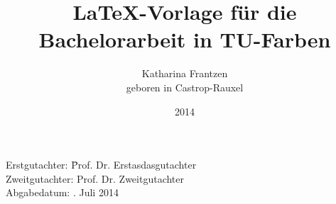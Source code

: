








\newcommand{\thetitle}{\LaTeX-Vorlage für die Bachelorarbeit in TU-Farben}
\newcommand{\Jahr}{2014}
\newcommand{\Geburtsort}{Castrop-Rauxel}
\newcommand{\Lehrstuhl}{Experimentelle Physik V}
\newcommand{\Betreuer}{Prof. Dr. Erstasdasgutachter}
\newcommand{\Zweitgutachter}{Prof. Dr. Zweitgutachter}
\newcommand{\Abgabedatum}{11. Juli 2014}

\author{
    Katharina Frantzen\\
    geboren in \Geburtsort
}

\titlehead{
    \texttt{[image: logos/tu-logo.pdf]}
}
\title{\thetitle}
\date{\Jahr}

\subject{Arbeit zur Erlangung des akademischen Grades\\Bachelor of Science}
\publishers{Lehrstuhl für \Lehrstuhl \\ Fakultät Physik \\ Technische Universität Dortmund}




\frontmatter
\maketitle
\thispagestyle{empty}
\vspace*{\fill}
\begin{tabbing}
    Erstgutachter: \hspace{3em}\=   \Betreuer \\ 
    Zweitgutachter: \> \Zweitgutachter\\
    Abgabedatum: \>\Abgabedatum
\end{tabbing}
\newpage

